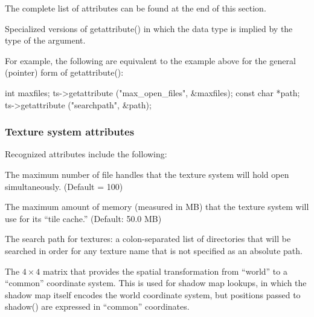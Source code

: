 The complete list of attributes can be found at the end of this section.


\apiend

Specialized versions of {\cf getattribute()} in which the data type is
implied by the type of the argument.

For example, the following are equivalent to the example above for the
general (pointer) form of {\cf getattribute()}:

\begin{code}
      int maxfiles;
      ts->getattribute ("max_open_files", &maxfiles);
      const char *path;
      ts->getattribute ("searchpath", &path);
\end{code}

\apiend


\subsubsection*{Texture system attributes}

Recognized attributes include the following:

The maximum number of file handles that the texture system will
hold open simultaneously.  (Default = 100)
\apiend

The maximum amount of memory (measured in MB) that the texture
system will use for its ``tile cache.'' (Default: 50.0 MB)
\apiend

The search path for textures: a colon-separated list of
directories that will be searched in order for any texture name
that is not specified as an absolute path.
\apiend

The $4 \times 4$ matrix that provides the spatial transformation
from ``world'' to a ``common'' coordinate system.  This is used for
shadow map lookups, in which the shadow map itself encodes the
world coordinate system, but positions passed to {\cf shadow()} are
expressed in ``common'' coordinates.
\apiend

